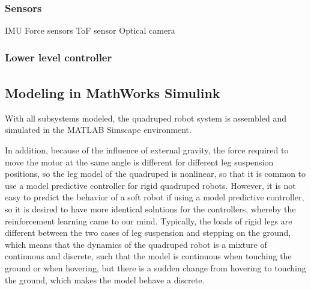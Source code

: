 \subsubsection{Sensors}
\ac{IMU} Force sensors \ac{ToF} sensor Optical camera
\subsubsection{Lower level controller}

\subsection{Modeling in MathWorks Simulink\texorpdfstring{\textsuperscript{\textregistered}}{(R)}}
With all subsystems modeled, the quadruped robot system is assembled and simulated in the MATLAB Simscape environment. 

In addition, because of the influence of external gravity, the force required to move the motor at the same angle is different for different leg suspension positions, so the leg model of the quadruped is nonlinear, so that it is common to use a model predictive controller for rigid quadruped robots. However, it is not easy to predict the behavior of a soft robot if using a model predictive controller\cite{BemporadLinearTimevaryingNonlinearMPC}, so it is desired to have more identical solutions for the controllers, whereby the  reinforcement learning came to our mind\cite{hewingLearningbasedModelPredictive2020}. Typically, the loads of rigid legs are different between the two cases of leg suspension and stepping on the ground\cite{biswalDevelopmentQuadrupedWalking2021}, which means that the dynamics of the quadruped robot is a mixture of continuous and discrete, such that the model is continuous when touching the ground or when hovering, but there is a sudden change from hovering to touching the ground, which makes the model behave a discrete. 


